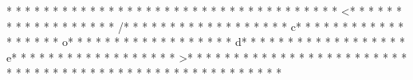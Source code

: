 * * *  * * *  * * *  *  * * *  *  * * *  * 
* * *  * * *  * * *  *  * * *  *  * * *  * <* * *  * * *  * * *  *  * * *  *  * * *  * /* * *  * * *  * * *  *  * * *  *  * * *  * c* * *  * * *  * * *  *  * * *  *  * * *  * o* * *  * * *  * * *  *  * * *  *  * * *  * d* * *  * * *  * * *  *  * * *  *  * * *  * e* * *  * * *  * * *  *  * * *  *  * * *  * >* * *  * * *  * * *  *  * * *  *  * * *  * 
* * *  * * *  * * *  *  * * *  *  * * *  * 
* * *  * * *  * * *  *  * * *  *  * * *  * %
